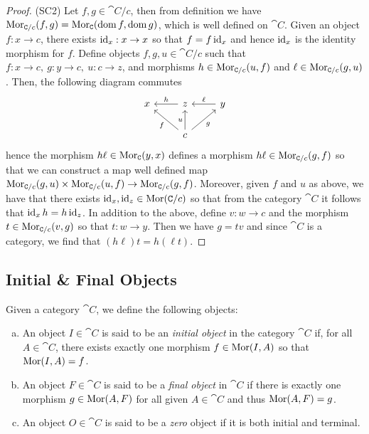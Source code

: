 \begin{proof}
    (SC2) Let \(f, g \in \cat C/c\), then from definition we have \(\operatorname{Mor}_{\texttt
        C/c}(f, g) = \operatorname{Mor}_{\texttt C}(\operatorname{dom} f, \operatorname{dom} g)\), which is well defined on \(\cat
    C\). Given an object \(f: x \to c\), there exists \(\operatorname{id}_x: x \to x\) so that
    \(f = f  \operatorname{id}_x\) and hence \(\operatorname{id}_x\) is the identity morphism for \(f\).
    Define objects \(f, g, u \in \cat C/c\) such that \(f: x \to c,\ g: y \to c,\
    u: c \to z\), and morphisms \(h \in \operatorname{Mor}_{\texttt C/c}(u, f)\) and \(\ell \in
    \operatorname{Mor}_{\texttt C/c}(g, u)\). Then, the following diagram commutes
    \[
        \begin{tikzcd}
            x
            &z \ar[l, swap, "h"]
            &y \ar[l, swap, "\ell"] \\
            &c \ar[lu, "f"] \ar[u, "u"] \ar[ru, swap, "g"]
        \end{tikzcd}
    \]
    hence the morphism \(h  \ell \in \operatorname{Mor}_{\texttt C}(y, x)\) defines a morphism
    \(h  \ell \in \operatorname{Mor}_{\texttt C/c}(g, f)\) so that we can construct a map well
    defined map \(\operatorname{Mor}_{\texttt C/c}(g, u) \times \operatorname{Mor}_{\texttt C/c}(u, f) \to
    \operatorname{Mor}_{\texttt C/c}(g, f)\). Moreover, given \(f\) and \(u\) as above, we have
    that there exists \(\operatorname{id}_x, \operatorname{id}_z \in \operatorname{Mor}(\texttt C/c)\) so that from the
    category \(\cat C\) it follows that \(\operatorname{id}_x  h = h  \operatorname{id}_z\). In
    addition to the above, define \(v: w \to c\) and the morphism \(t \in
    \operatorname{Mor}_{\texttt C/c}(v, g)\) so that \(t: w \to y\). Then we have \(g = t  v\)
    and since \(\cat C\) is a category, we find that \((h  \ell)  t = h
    (\ell  t)\).
\end{proof}

\subsection{Initial \& Final Objects}

\begin{definition}
    \label{def: initial and final objects}
    Given a category \(\cat C\), we define the following objects:
    \begin{enumerate}[(a)]\setlength\itemsep{0em}
        \item An object \(I \in \cat C\) is said to be an \emph{initial object} in the
              category \(\cat{C}\) if, for all \(A \in \cat C\), there exists exactly one
              morphism \(f \in \operatorname{Mor}(I, A)\) so that \(\operatorname{Mor}(I, A) = f\).
        \item An object \(F \in \cat C\) is said to be a \emph{final object} in \(\cat
              C\) if there is exactly one morphism \(g \in \operatorname{Mor}(A, F)\) for all given \(A \in
              \cat C\) and thus \(\operatorname{Mor}(A, F) = g\).
        \item An object \(O \in \cat C\) is said to be a \emph{zero} object if it is both
              initial and terminal.
    \end{enumerate}
\end{definition}

